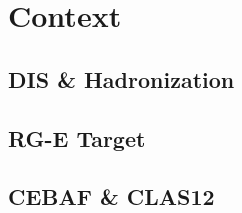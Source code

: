 \section{Context}
\begin{frame}{}
    \centering \Huge{}
\end{frame}

\subsection{DIS \& Hadronization}


\subsection{RG-E Target}


\subsection{CEBAF \& CLAS12}


